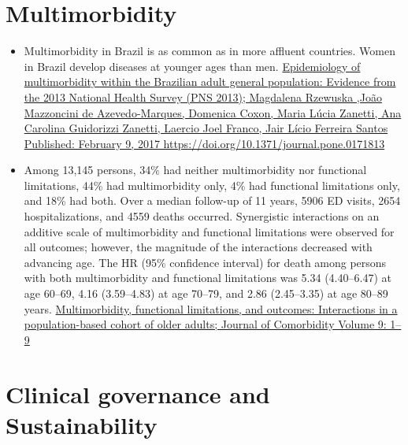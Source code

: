 \documentclass[]{book}
\begin{document}
\hypertarget{multimorbidity}{%
\section*{Multimorbidity}\label{multimorbidity}}

\begin{itemize}
\item
  Multimorbidity in Brazil is as common as in more affluent countries. Women in Brazil develop diseases at younger ages than men. \href{https://journals.plos.org/plosone/article?id=10.1371/journal.pone.0171813}{Epidemiology of multimorbidity within the Brazilian adult general population: Evidence from the 2013 National Health Survey (PNS 2013); Magdalena Rzewuska ,João Mazzoncini de Azevedo-Marques, Domenica Coxon, Maria Lúcia Zanetti, Ana Carolina Guidorizzi Zanetti, Laercio Joel Franco, Jair Lício Ferreira Santos Published: February 9, 2017 https://doi.org/10.1371/journal.pone.0171813}
\item
  Among 13,145 persons, 34\% had neither multimorbidity nor functional limitations, 44\% had multimorbidity only, 4\% had functional limitations only, and 18\% had both. Over a median follow-up of 11 years, 5906 ED visits, 2654 hospitalizations, and 4559 deaths occurred. Synergistic interactions on an additive scale of multimorbidity and functional limitations were observed for all outcomes; however, the magnitude of the interactions decreased with advancing age. The HR (95\% confidence interval) for death among persons with both multimorbidity and functional limitations was 5.34 (4.40--6.47) at age 60--69, 4.16 (3.59--4.83) at age 70--79, and 2.86 (2.45--3.35) at age 80--89 years. \href{https://journals.sagepub.com/doi/pdf/10.1177/2235042X19873486}{Multimorbidity, functional limitations, and outcomes: Interactions in a population-based cohort of older adults; Journal of Comorbidity Volume 9: 1--9}
\end{itemize}

\hypertarget{clinical-governance-and-sustainability}{%
\section*{Clinical governance and Sustainability}\label{clinical-governance-and-sustainability}}
\end{document}
